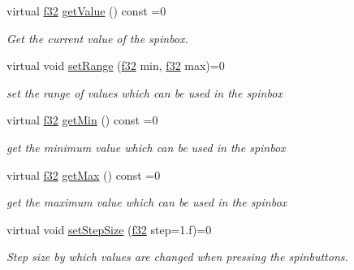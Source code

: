 \begin{DoxyCompactItemize}
virtual \hyperlink{namespaceirr_a0277be98d67dc26ff93b1a6a1d086b07}{f32} \hyperlink{classirr_1_1gui_1_1IGUISpinBox_acfb0ebe7ab30b58e9d34b7925e785bb8}{get\+Value} () const =0
\begin{DoxyCompactList}\small\item\em Get the current value of the spinbox. \end{DoxyCompactList}\item 
virtual void \hyperlink{classirr_1_1gui_1_1IGUISpinBox_af7bc07a7be30d16a6ff27750782aaa80}{set\+Range} (\hyperlink{namespaceirr_a0277be98d67dc26ff93b1a6a1d086b07}{f32} min, \hyperlink{namespaceirr_a0277be98d67dc26ff93b1a6a1d086b07}{f32} max)=0
\begin{DoxyCompactList}\small\item\em set the range of values which can be used in the spinbox \end{DoxyCompactList}\item 
\mbox{\label{classirr_1_1gui_1_1IGUISpinBox_a22f2211e612a7cfe7847d249724cadc1}} 
virtual \hyperlink{namespaceirr_a0277be98d67dc26ff93b1a6a1d086b07}{f32} \hyperlink{classirr_1_1gui_1_1IGUISpinBox_a22f2211e612a7cfe7847d249724cadc1}{get\+Min} () const =0
\begin{DoxyCompactList}\small\item\em get the minimum value which can be used in the spinbox \end{DoxyCompactList}\item 
\mbox{\label{classirr_1_1gui_1_1IGUISpinBox_af332d184560dee8f273b50d1beca45cc}} 
virtual \hyperlink{namespaceirr_a0277be98d67dc26ff93b1a6a1d086b07}{f32} \hyperlink{classirr_1_1gui_1_1IGUISpinBox_af332d184560dee8f273b50d1beca45cc}{get\+Max} () const =0
\begin{DoxyCompactList}\small\item\em get the maximum value which can be used in the spinbox \end{DoxyCompactList}\item 
virtual void \hyperlink{classirr_1_1gui_1_1IGUISpinBox_a64296e93b52129fcf9068279baf0697d}{set\+Step\+Size} (\hyperlink{namespaceirr_a0277be98d67dc26ff93b1a6a1d086b07}{f32} step=1.f)=0
\begin{DoxyCompactList}\small\item\em Step size by which values are changed when pressing the spinbuttons. \end{DoxyCompactList}\item 

\end{DoxyCompactItemize}
